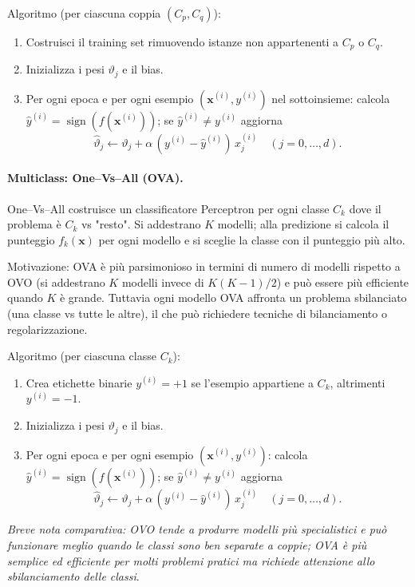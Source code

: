 \noindent
Algoritmo (per ciascuna coppia $(C_p,C_q)$):
\begin{enumerate}
  \item Costruisci il training set rimuovendo istanze non appartenenti a $C_p$ o $C_q$.
  \item Inizializza i pesi $\vartheta_j$ e il bias.
  \item Per ogni epoca e per ogni esempio $(\mathbf{x}^{(i)},y^{(i)})$ nel sottoinsieme: calcola $\hat{y}^{(i)}=\operatorname{sign}(f(\mathbf{x}^{(i)}))$; se $\hat{y}^{(i)}\neq y^{(i)}$ aggiorna
  \[\hat{\vartheta}_j\leftarrow\vartheta_j+\alpha\,(y^{(i)}-\hat{y}^{(i)})\,x_j^{(i)}\quad(j=0,\dots,d).\]
\end{enumerate}

\paragraph{Multiclass: One–Vs–All (OVA).}
One–Vs–All costruisce un classificatore Perceptron per ogni classe $C_k$ dove il problema è $C_k$ vs "resto". Si addestrano $K$ modelli; alla predizione si calcola il punteggio $f_k(\mathbf{x})$ per ogni modello e si sceglie la classe con il punteggio più alto.

Motivazione: OVA è più parsimonioso in termini di numero di modelli rispetto a OVO (si addestrano $K$ modelli invece di $K(K-1)/2$) e può essere più efficiente quando $K$ è grande. Tuttavia ogni modello OVA affronta un problema sbilanciato (una classe vs tutte le altre), il che può richiedere tecniche di bilanciamento o regolarizzazione.

\noindent
Algoritmo (per ciascuna classe $C_k$):
\begin{enumerate}
  \item Crea etichette binarie $y^{(i)}=+1$ se l'esempio appartiene a $C_k$, altrimenti $y^{(i)}=-1$.
  \item Inizializza i pesi $\vartheta_j$ e il bias.
  \item Per ogni epoca e per ogni esempio $(\mathbf{x}^{(i)},y^{(i)})$: calcola $\hat{y}^{(i)}=\operatorname{sign}(f(\mathbf{x}^{(i)}))$; se $\hat{y}^{(i)}\neq y^{(i)}$ aggiorna
  \[\hat{\vartheta}_j\leftarrow\vartheta_j+\alpha\,(y^{(i)}-\hat{y}^{(i)})\,x_j^{(i)}\quad(j=0,\dots,d).\]
\end{enumerate}

\noindent
\textit{Breve nota comparativa: OVO tende a produrre modelli più specialistici e può funzionare meglio quando le classi sono ben separate a coppie; OVA è più semplice ed efficiente per molti problemi pratici ma richiede attenzione allo sbilanciamento delle classi}.


